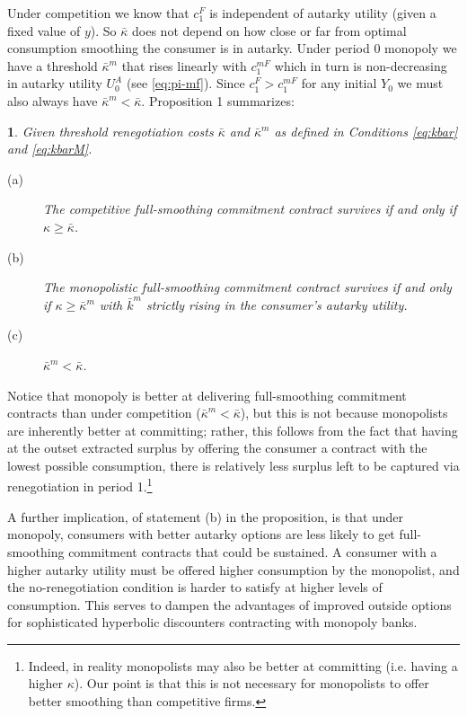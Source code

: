\documentclass[11pt,english]{article}
\theoremstyle{plain}
\newtheorem{prop}{\protect\propositionname}
\theoremstyle{definition}
\providecommand{\propositionname}{Proposition}
\begin{document}
Under competition we know that $c_{1}^{F}$ is independent of autarky
utility (given a fixed value of $y$). So $\bar{\kappa}$ does not
depend on how close or far from optimal consumption smoothing the
consumer is in autarky. Under period 0 monopoly we have a threshold
$\bar{\kappa}^{m}$ that rises linearly with $c_{1}^{mF}$ which in
turn is non-decreasing in autarky utility $U_{0}^{A}$ (see
\ref{eq:pi-mf}). Since $c_{1}^{F}>c_{1}^{mF}$ for any initial $Y_{0}$
we must also always have $\bar{\kappa}^{m}<\bar{\kappa}$.
Proposition 1 summarizes: 
\begin{prop}
\label{Prop:full-commit} Given threshold renegotiation costs $\bar{\kappa}$
and $\bar{\kappa}^{m}$ as defined in Conditions \ref{eq:kbar} and
\ref{eq:kbarM}. 
\begin{description}
\item [{(a)}] The competitive full-smoothing commitment contract survives
if and only if $\kappa\geq$$\bar{\kappa}$. 
\item [{(b)}] The monopolistic full-smoothing commitment contract survives
if and only if $\kappa\geq$$\bar{\kappa}^{m}$ with $\bar{k}^{m}$
strictly rising in the consumer's autarky utility. 
\item [{(c)}] $\bar{\kappa}^{m}<\bar{\kappa}$. 
\end{description}
\end{prop}
Notice that monopoly is better at delivering full-smoothing commitment
contracts than under competition ($\bar{\kappa}^{m}<\bar{\kappa}$),
but this is not because monopolists are inherently better at committing;
rather, this follows from the fact that having at the outset extracted
surplus by offering the consumer a contract with the lowest possible
consumption, there is relatively less surplus left to be captured
via renegotiation in period 1.\footnote{Indeed, in reality monopolists may also be better at committing (i.e.
having a higher $\kappa$). Our point is that this is not necessary
for monopolists to offer better smoothing than competitive firms.}

A further implication, of statement (b) in the proposition, is that
under monopoly, consumers with better autarky options are less likely
to get full-smoothing commitment contracts that could be sustained.
A consumer with a higher autarky utility must be offered higher consumption
by the monopolist, and the no-renegotiation condition is harder to
satisfy at higher levels of consumption.
This serves to dampen the advantages of improved outside options for sophisticated hyperbolic discounters contracting with monopoly banks.
\end{document}
